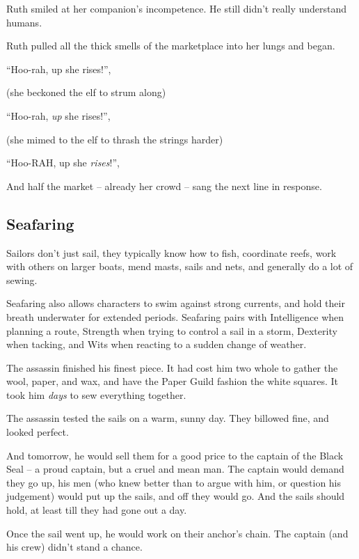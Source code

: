 \begin{multicols}{2}
\begin{exampletext}
  Ruth smiled at her companion's incompetence.
  He still didn't really understand humans.

  Ruth pulled all the thick smells of the marketplace into her lungs and began.

  ``Hoo-rah, up she rises!'',

  (she beckoned the elf to strum along)

  ``Hoo-rah, \emph{up} she rises!'',

  (she mimed to the elf to thrash the strings harder)

  ``Hoo-RAH, up she \emph{rises}!'',

  And half the market -- already her crowd -- sang the next line in response.

\end{exampletext}

\subsection{Seafaring}

Sailors don't just sail, they typically know how to fish, coordinate reefs, work with others on larger boats, mend masts, sails and nets, and generally do a lot of sewing.

Seafaring also allows characters to swim against strong currents, and hold their breath underwater for extended periods.
Seafaring pairs with Intelligence when planning a route, Strength when trying to control a sail in a storm, Dexterity when tacking, and Wits when reacting to a sudden change of weather.

\begin{exampletext}
  The assassin finished his finest piece.
  It had cost him two whole  to gather the wool, paper, and wax, and have the Paper Guild fashion the white squares.
  It took him \emph{days} to sew everything together.

  The assassin tested the sails on a warm, sunny day.
  They billowed fine, and looked perfect.

  And tomorrow, he would sell them for a good price to the captain of the Black Seal -- a proud captain, but a cruel and mean man.
  The captain would demand they go up, his men (who knew better than to argue with him, or question his judgement) would put up the sails, and off they would go.
  And the sails should hold, at least till they had gone out a day.

  Once the sail went up, he would work on their anchor's chain.
  The captain (and his crew) didn't stand a chance.


\end{exampletext}
\end{multicols}

